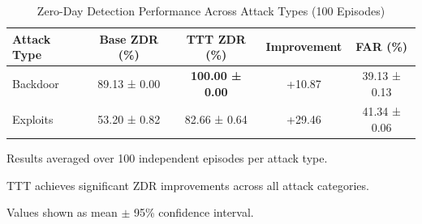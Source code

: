 \begin{table}[htbp]
\centering
\caption{Zero-Day Detection Performance Across Attack Types (100 Episodes)}
\label{tab:multi_attack_zdr}
\begin{tabular}{lcccc}
\hline
Attack Type & Base ZDR (\%) & TTT ZDR (\%) & Improvement & FAR (\%) \\
\hline
Backdoor & 89.13 ± 0.00 & \textbf{100.00 ± 0.00} & +10.87 & 39.13 ± 0.13 \\
Exploits & 53.20 ± 0.82 & 82.66 ± 0.64 & +29.46 & 41.34 ± 0.06 \\
\hline
\end{tabular}
\begin{tablenotes}
\small
\item Results averaged over 100 independent episodes per attack type.
\item TTT achieves significant ZDR improvements across all attack categories.
\item Values shown as mean $\pm$ 95\% confidence interval.
\end{tablenotes}
\end{table}
